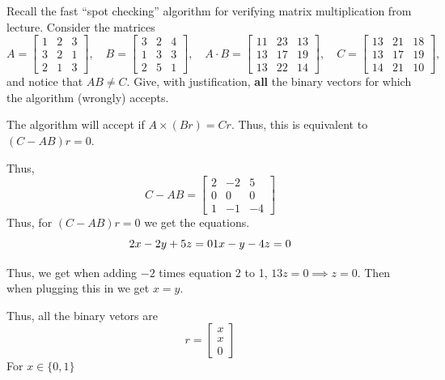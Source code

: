 \documentclass[12pt, letterpaper]{article}
\begin{document}
\begin{subproblem}{}
    Recall the fast ``spot checking'' algorithm for verifying matrix multiplication from lecture.
    Consider the matrices
    \[
      A =
      \begin{bmatrix}
        1 & 2 & 3 \\
        3 & 2 & 1 \\
        2 & 1 & 3
      \end{bmatrix}, \quad
      B =
      \begin{bmatrix}
        3 & 2 & 4 \\
        1 & 3 & 3 \\
        2 & 5 & 1
      \end{bmatrix}, \quad
      A\cdot B = 
      \begin{bmatrix}
        11 & 23 & 13 \\
        13 & 17 & 19 \\
        13 & 22 & 14
      \end{bmatrix}, \quad
      C = 
      \begin{bmatrix}
        13 & 21 & 18 \\
        13 & 17 & 19 \\
        14 & 21 & 10
      \end{bmatrix},
    \]
    and notice that $AB \neq C$.
    Give, with justification, \textbf{all} the binary vectors for which the algorithm (wrongly) accepts. 
\end{subproblem}
\begin{problemproof}
    The algorithm will accept if $A \times (Br)=Cr$. Thus, this is equivalent to $(C-AB)r=0$.

    Thus,
    \[C-AB = 
      \begin{bmatrix}
        2 & -2 & 5 \\
        0 & 0 & 0 \\
        1 & -1 & -4
      \end{bmatrix}\]
    Thus, for $(C-AB)r=0$ we get the equations.
    \begin{equation*}
        2x - 2y + 5z = 0\\
        1x - y -4z = 0
    \end{equation*}

    Thus, we get when adding $-2$ times equation 2 to 1, $13z=0 \implies z=0$. Then when plugging this in we get $x=y$.

    Thus, all the binary vetors are
    \[r=\begin{bmatrix}
        x\\
        x\\
        0
      \end{bmatrix}\]
    For $x \in \{0,1\}$
\end{problemproof}
\end{document}
